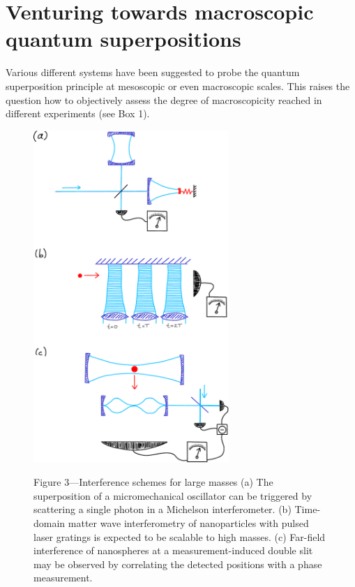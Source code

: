 \documentclass[11pt]{article}
\begin{document}
\section{Venturing towards macroscopic quantum superpositions }

Various different systems have been suggested to probe the quantum superposition principle at mesoscopic or even macroscopic scales.
This raises the question how to objectively assess the degree of macroscopicity reached in different experiments\cite{Nimmrichter2013} (see Box 1).


\begin{figure}
\centerline{
\includegraphics[width=0.66\textwidth]{Fig3-sketch.pdf}}
\small
{Figure 3---Interference schemes for large masses}
(a) The superposition of a micromechanical oscillator can be triggered by scattering a single photon in a Michelson interferometer.
(b) Time-domain matter wave interferometry  of nanoparticles with pulsed laser gratings is expected to be scalable to high masses.
(c) Far-field interference of nanospheres at a measurement-induced double slit may be observed by correlating the detected positions with a phase measurement. 
\end{figure} 
\end{document}
